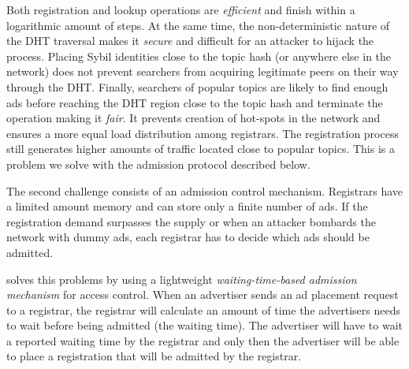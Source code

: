 Both registration and lookup operations are \emph{efficient} and finish within a logarithmic amount of steps. At the same time, the non-deterministic nature of the DHT traversal makes it \emph{secure} and difficult for an attacker to hijack the process. Placing Sybil identities close to the topic hash (or anywhere else in the network) does not prevent searchers from acquiring legitimate peers on their way through the DHT. Finally, searchers of popular topics are likely to find enough ads before reaching the DHT region close to the topic hash and terminate the operation making it \emph{fair}. It prevents creation of hot-spots in the network and ensures a more equal load distribution among registrars. The registration process still generates higher amounts of traffic located close to popular topics. This is a problem we solve with the admission protocol described below.

 The second challenge consists of an admission control mechanism. Registrars have a limited amount memory and can store only a finite number of ads. If the registration demand surpasses the supply or when an attacker bombards the network with dummy ads, each registrar has to decide which ads should be admitted. 

\sysname solves this problems by using a lightweight \textit{waiting-time-based admission mechanism} for access control. When an advertiser sends an ad placement request to a registrar, the registrar will calculate an amount of time the advertisers needs to wait before being admitted (\ie the waiting time). 
The advertiser will have to wait a reported waiting time by the registrar and only then the advertiser will be able to place a registration that will be admitted by the registrar.

